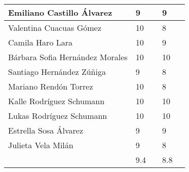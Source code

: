 \begin{tabular}{lllll}
    Emiliano Castillo Álvarez         & 9                             &  & 9           &   \\\hline
    Valentina Cuacuas Gómez           & 10                            &  & 8           &   \\\hline
    Camila Haro Lara                  & 10                            &  & 9           &   \\\hline
    Bárbara Sofia Hernández Morales   & 10                            &  & 10          &   \\\hline
    Santiago Hernández Zúñiga         & 9                             &  & 8           &   \\\hline
    Mariano Rendón Torrez             & 10                            &  & 8           &   \\\hline
    Kalle Rodríguez Schumann          & 10                            &  & 10          &   \\\hline
    Lukas Rodríguez Schumann          & 10                            &  & 10          &   \\\hline
    Estrella Sosa Álvarez             & 9                             &  & 9           &   \\\hline
    Julieta Vela Milán                & 9                             &  & 8           &   \\\hline
                                      & 9.4                           &  & 8.8         &   \\\hline
    \bottomrule
\end{tabular}
